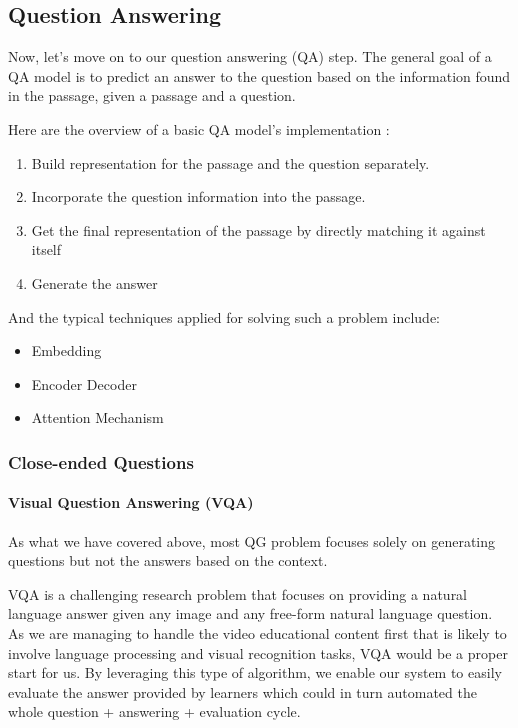 \documentclass[]{book}
\let\oldparagraph\paragraph
\renewcommand{\paragraph}[1]{\oldparagraph{#1}\mbox{}}
\theoremstyle{definition}
\theoremstyle{definition}
\theoremstyle{definition}
\theoremstyle{remark}
\begin{document}
\subsection{Question Answering}\label{question-answering}

Now, let's move on to our question answering (QA) step. The general goal
of a QA model is to predict an answer to the question based on the
information found in the passage, given a passage and a question.

Here are the overview of a basic QA model's implementation
\citep{qa_imp}:

\begin{enumerate}
\def\labelenumi{\arabic{enumi}.}
\item
  Build representation for the passage and the question separately.
\item
  Incorporate the question information into the passage.
\item
  Get the final representation of the passage by directly matching it
  against itself
\item
  Generate the answer
\end{enumerate}

And the typical techniques applied for solving such a problem include:

\begin{itemize}
\item
  Embedding
\item
  Encoder Decoder
\item
  Attention Mechanism
\end{itemize}

\subsubsection{Close-ended Questions}\label{close-ended-questions}

\paragraph{Visual Question Answering
(VQA)}\label{visual-question-answering-vqa}

As what we have covered above, most QG problem focuses solely on
generating questions but not the answers based on the context.

VQA is a challenging research problem that focuses on providing a
natural language answer given any image and any free-form natural
language question. As we are managing to handle the video educational
content first that is likely to involve language processing and visual
recognition tasks, VQA would be a proper start for us. By leveraging
this type of algorithm, we enable our system to easily evaluate the
answer provided by learners which could in turn automated the whole
question + answering + evaluation cycle.
\end{document}
